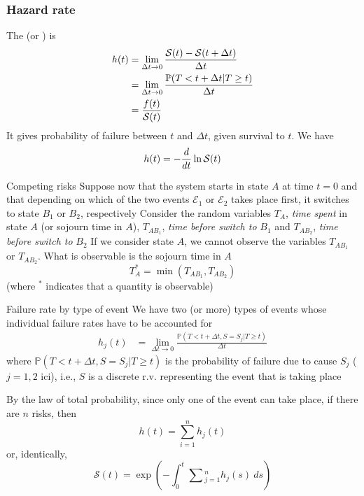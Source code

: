 \documentclass[aspectratio=169]{beamer}\usepackage[]{graphicx}\usepackage[]{xcolor}
\begin{document}
\begin{frame}\frametitle{Hazard rate}
The  (or ) is
\begin{align*}
h(t) &= \lim_{\Delta t\to 0}\frac{\S(t)-\S(t+\Delta t)}{\Delta t} \\
& = \lim_{\Delta t\to 0} \frac{\IP(T<t+\Delta t | T\geq
t)}{\Delta t} \\
&= \frac{f(t)}{\S(t)}
\end{align*}
It gives probability of failure between $t$ and $\Delta t$, given survival to $t$.
\vfill
We have
\[
h(t)=-\frac{d}{dt}\ln\S(t)
\]
\end{frame}




\begin{frame}{Competing risks}
Suppose now that the system starts in state $A$ at time $t=0$ and that depending on which of the two events $\mathcal{E}_1$ or $\mathcal{E}_2$ takes place first, it switches to state $B_1$ or $B_2$, respectively
\vfill
Consider the random variables $T_A$, \emph{time spent} in state $A$ (or sojourn time in $A$), $T_{AB_1}$, \emph{time before switch to} $B_1$ and $T_{AB_2}$, \emph{time before switch to} $B_2$
\vfill
If we consider state $A$, we cannot observe the variables $T_{AB_1}$ or $T_{AB_2}$. What is observable is the sojourn time in $A$
\[
T^*_A=\min\left( T_{AB_1},T_{AB_2} \right)
\]
(where $^*$ indicates that a quantity is observable)
\end{frame}

\begin{frame}{Failure rate by type of event}
We have two (or more) types of events whose individual failure rates have to be accounted for
\begin{align*}
h_j(t) &= \lim_{\Delta t\to 0} \frac{\mathbb{P}( T<t+\Delta t, S=S_j | T\geq t)}{\Delta t} 
\end{align*}
where $\mathbb{P}(T<t+\Delta t, S=S_j | T\geq t)$ is the probability of failure due to cause $S_j$ ($j=1,2$ ici), i.e., $S$ is a discrete r.v. representing the event that is taking place
\end{frame}

\begin{frame}
By the law of total probability, since only one of the event can take place, if there are $n$ risks, then
$$
h(t) = \sum_{i=1}^n h_j(t)
$$
or, identically,
$$
\mathcal{S}(t)
=
\exp\left(
  -\int_0^t \sum\textstyle_{j=1}^n h_j(s)\ ds
\right)
$$
\end{frame}
\end{document}

